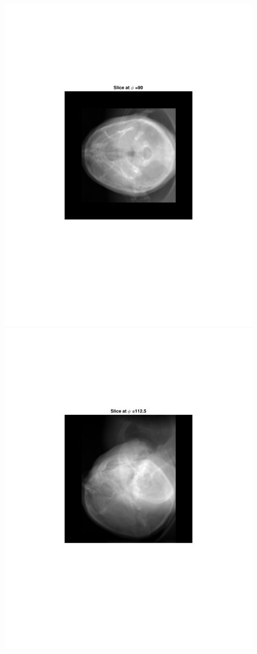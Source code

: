 \documentclass{UCF_ETD}
\begin{document}
\begin{figure}[H]
\begin{center}
\includegraphics[scale=0.5]{FVR/CompSlice90}
\includegraphics[scale=0.5]{FVR/CompSlice113}

\end{center}
\end{figure}
\end{document}
